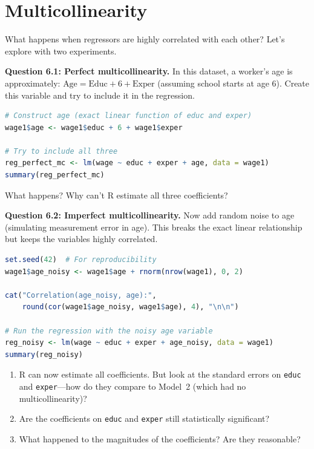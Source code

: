 \documentclass[11pt,letterpaper]{article}
\begin{document}
\vspace{3cm}

\newpage

\section{Multicollinearity}

What happens when regressors are highly correlated with each other? Let's explore with two experiments.

\textbf{Question 6.1: Perfect multicollinearity.} In this dataset, a worker's age is approximately: $\text{Age} = \text{Educ} + 6 + \text{Exper}$ (assuming school starts at age 6). Create this variable and try to include it in the regression.

\begin{lstlisting}[language=R]
# Construct age (exact linear function of educ and exper)
wage1$age <- wage1$educ + 6 + wage1$exper

# Try to include all three
reg_perfect_mc <- lm(wage ~ educ + exper + age, data = wage1)
summary(reg_perfect_mc)
\end{lstlisting}

What happens? Why can't R estimate all three coefficients?

\vspace{3cm}

\textbf{Question 6.2: Imperfect multicollinearity.} Now add random noise to age (simulating measurement error in age). This breaks the exact linear relationship but keeps the variables highly correlated.

\begin{lstlisting}[language=R]
set.seed(42)  # For reproducibility
wage1$age_noisy <- wage1$age + rnorm(nrow(wage1), 0, 2)

cat("Correlation(age_noisy, age):",
    round(cor(wage1$age_noisy, wage1$age), 4), "\n\n")

# Run the regression with the noisy age variable
reg_noisy <- lm(wage ~ educ + exper + age_noisy, data = wage1)
summary(reg_noisy)
\end{lstlisting}

\begin{enumerate}[label=(\alph*)]
\item R can now estimate all coefficients. But look at the standard errors on \texttt{educ} and \texttt{exper}---how do they compare to Model~2 (which had no multicollinearity)?
\item Are the coefficients on \texttt{educ} and \texttt{exper} still statistically significant?
\item What happened to the magnitudes of the coefficients? Are they reasonable?
\end{enumerate}
\end{document}
